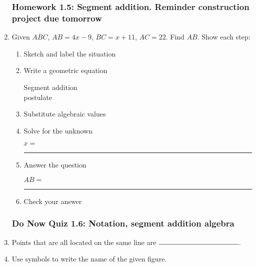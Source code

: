 \documentclass[12pt, twoside]{article}
\begin{document}
\begin{enumerate}
\subsubsection*{Homework 1.5: Segment addition. Reminder construction project due tomorrow}
\item Given $\overline{ABC}$, $AB=4x-9$, $BC=x+11$, $AC=22$. Find ${AB}$. Show each step:\\[0.5in]
  \begin{center}
  \end{center}
    \vspace{1cm}
  \begin{enumerate}
    \item Sketch and label the situation
    \item Write a geometric equation\\
    \begin{flushright} Segment addition\\ postulate \end{flushright}
    \item Substitute algebraic values
    \item Solve for the unknown \vspace{3cm}
    \begin{center} $x=$ \rule{1cm}{0.15mm} \end{center}
    \item Answer the question\\
    \begin{center} $AB=$ \rule{1cm}{0.15mm} \end{center}
    \item Check your answer
  \end{enumerate}

\newpage
\subsubsection*{Do Now Quiz 1.6: Notation, segment addition algebra}
\item Points that are all located on the same line are \qquad $\rule{4cm}{0.15mm}$.\bigskip

\item Use symbols to write the name of the given figure.
   \bigskip


\end{enumerate}
\end{document}
